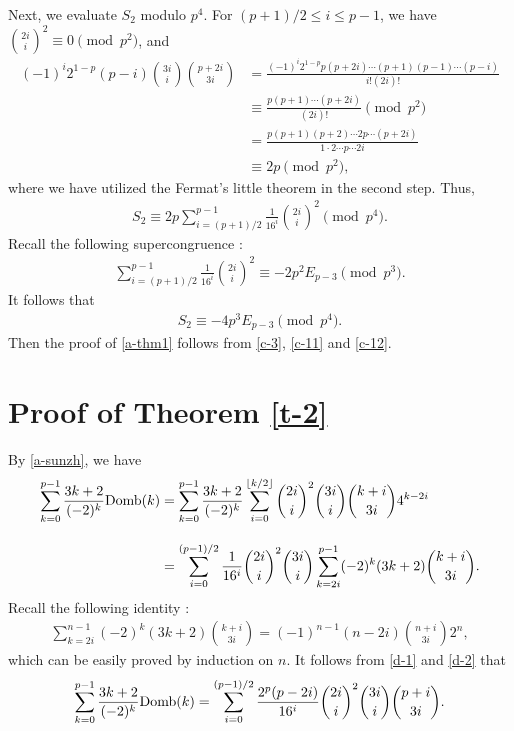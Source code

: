 \documentclass[12pt]{article}
\numberwithin{equation}{section}
\begin{document}
Next, we evaluate $S_2$ modulo $p^4$. For $(p+1)/2\le i \le p-1$, we have
${2i\choose i}^2\equiv 0\pmod{p^2}$, and
\begin{align*}
(-1)^i2^{1-p}(p-i){3i\choose i}{p+2i\choose 3i}&=\frac{(-1)^i2^{1-p}p(p+2i)\cdots(p+1)(p-1)\cdots(p-i)}{i!(2i)!}\\[10pt]
&\equiv \frac{p(p+1)\cdots(p+2i)}{(2i)!}\pmod{p^2}\\[10pt]
&=\frac{p(p+1)(p+2)\cdots 2p \cdots(p+2i)}{1\cdot2\cdots p\cdots 2i}\\[10pt]
&\equiv 2p\pmod{p^2},
\end{align*}
where we have utilized the Fermat's little theorem in the second step. Thus,
\begin{align*}
S_2\equiv 2p\sum_{i=(p+1)/2}^{p-1}\frac{1}{16^i}{2i\choose i}^2\pmod{p^4}.
\end{align*}
Recall the following supercongruence \cite[(1.9)]{sunzw-scm-2011}:
\begin{align*}
\sum_{i=(p+1)/2}^{p-1}\frac{1}{16^i}{2i\choose i}^2\equiv -2p^2E_{p-3}\pmod{p^3}.
\end{align*}
It follows that
\begin{align}
S_2\equiv -4p^3E_{p-3}\pmod{p^4}.\label{c-12}
\end{align}
Then the proof of \eqref{a-thm1} follows from \eqref{c-3}, \eqref{c-11} and \eqref{c-12}.

\section{Proof of Theorem \ref{t-2}}
By \eqref{a-sunzh}, we have
\begin{align}
\sum_{k=0}^{p-1}\frac{3k+2}{(-2)^k}{\rm Domb}(k)
&=\sum_{k=0}^{p-1}\frac{3k+2}{(-2)^k}\sum_{i=0}^{\lfloor k/2\rfloor}{2i\choose i}^2{3i\choose i}
{k+i\choose 3i}4^{k-2i}\notag\\[10pt]
&=\sum_{i=0}^{(p-1)/2}\frac{1}{16^i}{2i\choose i}^2{3i\choose i}\sum_{k=2i}^{p-1}
(-2)^k(3k+2){k+i\choose 3i}.\label{d-1}
\end{align}
Recall the following identity \cite[(2.4)]{guo-itsf-2013}:
\begin{align}
\sum_{k=2i}^{n-1}(-2)^k(3k+2){k+i\choose 3i}=(-1)^{n-1}(n-2i){n+i\choose 3i}2^n,\label{d-2}
\end{align}
which can be easily proved by induction on $n$.
It follows from \eqref{d-1} and \eqref{d-2} that
\begin{align}
\sum_{k=0}^{p-1}\frac{3k+2}{(-2)^k}{\rm Domb}(k)=
\sum_{i=0}^{(p-1)/2}\frac{2^p(p-2i)}{16^i}{2i\choose i}^2{3i\choose i}{p+i\choose 3i}.\label{d-3}
\end{align}
\end{document}
